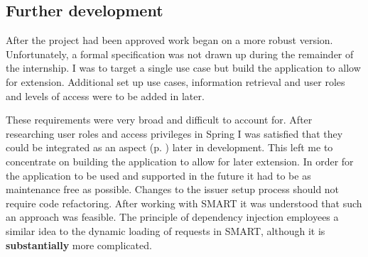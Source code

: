 \documentclass[a4paper, 11pt, titlepage]{article}
\begin{document}
\subsection{Further development} 
 
After the project had been approved work began on a more robust version. Unfortunately, a formal specification was not drawn up during the remainder of the internship. I was to target a single use case but build the application to allow for extension. Additional set up use cases, information retrieval and user roles and levels of access were to be added in later. 
 
These requirements were very broad and difficult to account for. After researching user roles and access privileges in Spring I was satisfied that they could be integrated as an aspect (p. \pageref{aspect}) later in development. This left me to concentrate on building the application to allow for later extension. In order for the application to be used and supported in the future it had to be as maintenance free as possible. Changes to the issuer setup process should not require code refactoring. After working with SMART it was understood that such an approach was feasible. The principle of dependency injection employees a similar idea to the dynamic loading of requests in SMART, although it is \textbf{substantially} more complicated. 
 
\end{document}
